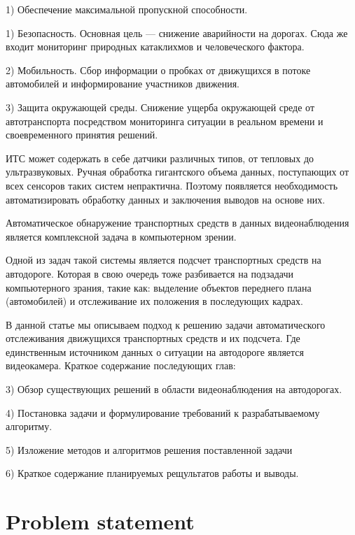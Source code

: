 \documentclass[12pt,a4paper,oneside,titlepage]{article}
\begin{document}
1) Обеспечение максимальной пропускной способности.

1) Безопасность. Основная цель — снижение аварийности на дорогах. Сюда же входит мониторинг природных катаклихмов и человеческого фактора.

2) Мобильность. Сбор информации о пробках от движущихся в потоке автомобилей и информирование участников движения.

3) Защита окружающей среды. Снижение ущерба окружающей среде от автотранспорта посредством мониторинга ситуации в реальном времени и своевременного принятия решений.

ИТС может содержать в себе датчики различных типов, от тепловых до ультразвуковых.
Ручная обработка гигантского объема данных, поступающих от всех сенсоров таких систем непрактична.
Поэтому появляется необходимость автоматизировать обработку данных и заключения выводов на основе них.

Автоматическое обнаружение транспортных средств в данных видеонаблюдения является комплексной задача в компьютерном зрении.

Одной из задач такой системы является подсчет транспортных средств на автодороге.
Которая в свою очередь тоже разбивается на подзадачи компьютерного зрания, такие как: выделение объектов переднего плана (автомобилей) и отслеживание их положения в последующих кадрах.


В данной статье мы описываем подход к решению задачи автоматического отслеживания движущихся транспортных средств и их подсчета.
Где единственным источником данных о ситуации на автодороге является видеокамера. 
Краткое содержание последующих глав:

3) Обзор существующих решений в области видеонаблюдения на автодорогах.

4) Постановка задачи и формулирование требований к разрабатываемому алгоритму.

5) Изложение методов и алгоритмов решения поставленной задачи

6) Краткое содержание планируемых рещультатов работы и выводы.

\newpage
\section*{Problem statement}
\end{document}
